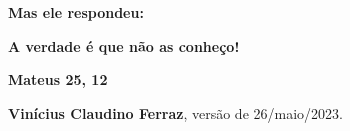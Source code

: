 \documentclass{rbfin}
\begin{document}
\shorttitle{$\,$} %
\rbfe{}
\autor{$\,$}

$\,$

\vspace{40mm}

\Huge

\begin{center}
\textbf{Mas ele respondeu:}

\textbf{A verdade é que não as conheço!}

\textbf{Mateus 25, 12}

\end{center}

\vspace{90mm}

\Large

\begin{flushright}
\textbf{Vinícius Claudino Ferraz}, versão de 26/maio/2023.
\end{flushright}

\LARGE

\newpage

\doublespacing
\end{document}
